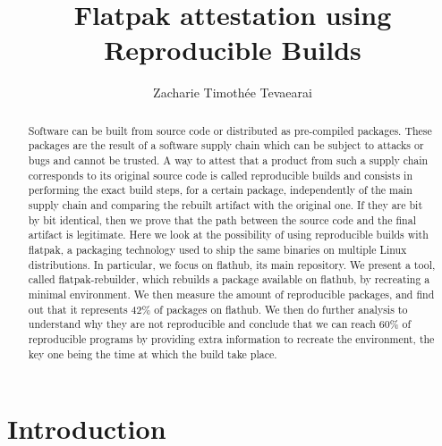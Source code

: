 \documentclass[a4paper,11pt,oneside]{report}
\title{Flatpak attestation using Reproducible Builds}
\author{Zacharie Timothée Tevaearai}
\theoremstyle{definition}
\newcommand{\sysname}{flatpak-rebuilder\xspace}
\newcommand{\rb}{reproducible builds\xspace}
\newcommand{\fp}{flatpak\xspace}
\newcommand{\fh}{flathub\xspace}
\begin{document}
\maketitle

\begin{abstract}
Software can be built from source code or distributed as pre-compiled packages.
These packages are the result of a software supply chain which can be
subject to attacks or bugs and cannot be trusted. A way to attest that a
product from such a supply chain corresponds to its original source code is
called \rb and consists in performing the exact build steps, for a certain
package, independently of the main supply chain and comparing the rebuilt
artifact with the original one. If they are bit by bit identical, then we
prove that the path between the source code and the final artifact is
legitimate. Here we look at the possibility of using reproducible builds
with \fp, a packaging technology used to ship the same binaries on multiple
Linux distributions. In particular, we focus on \fh, its main repository.
We present a tool, called \sysname, which rebuilds a package available on
\fh, by recreating a minimal environment. We then measure the amount of
reproducible packages, and find out that it represents 42\% of packages
on \fh. We then do further analysis to understand why they are not
reproducible and conclude that we can reach 60\% of reproducible programs
by providing extra information to recreate the environment, the key one
being the time at which the build take place.
\end{abstract}

\maketoc

\chapter{Introduction}
\end{document}
